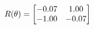 \documentclass[preview]{standalone}
\begin{document}
\begin{align*}
\special{dvisvgm:raw <g id='unique000'>}R(\theta) = \begin{bmatrix}-0.07 & 1.00\\-1.00 & -0.07\end{bmatrix}\special{dvisvgm:raw </g>}
\end{align*}
\end{document}
